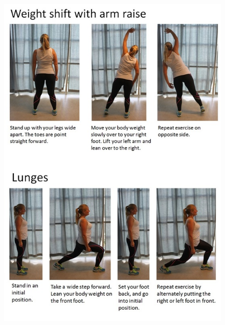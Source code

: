 \begin{figure} [H]
\centering
\includegraphics[scale=0.8]{WeightShift.jpg}
\label{app:weightshift}
\end{figure} 

